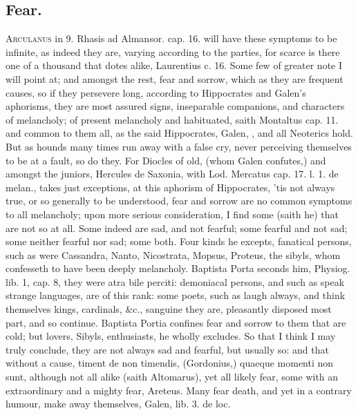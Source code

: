 {\subsection{Fear.}
\lettrine{A}{rculanus} in 9. Rhasis ad Almansor. cap. 16. will have these
symptoms to be infinite, as indeed they are, varying according to the
parties, for scarce is there one of a thousand that dotes alike, 
Laurentius c. 16. Some few of greater note I will point at; and amongst
the rest, fear and sorrow, which as they are frequent causes, so if
they persevere long, according to Hippocrates and Galen's
aphorisms, they are most assured signs, inseparable companions, and
characters of melancholy; of present melancholy and habituated, saith
Montaltus cap. 11. and common to them all, as the said Hippocrates,
Galen, \Avicenna{}, and all Neoterics hold. But as hounds many times run
away with a false cry, never perceiving themselves to be at a fault, so
do they. For Diocles of old, (whom Galen confutes,) and amongst the
juniors, Hercules de Saxonia, with Lod. Mercatus cap. 17. l. 1.
de melan., takes just exceptions, at this aphorism of Hippocrates, 'tis
not always true, or so generally to be understood, fear and sorrow are
no common symptoms to all melancholy; upon more serious consideration,
I find some (saith he) that are not so at all. Some indeed are sad, and
not fearful; some fearful and not sad; some neither fearful nor sad;
some both. Four kinds he excepts, fanatical persons, such as were
Cassandra, Nanto, Nicostrata, Mopsus, Proteus, the sibyls, whom
\Aristotle{} confesseth to have been deeply melancholy. Baptista
Porta seconds him, Physiog. lib. 1, cap. 8, they were atra bile
perciti: demoniacal persons, and such as speak strange languages, are
of this rank: some poets, such as laugh always, and think themselves
kings, cardinals, \&c., sanguine they are, pleasantly disposed most
part, and so continue. Baptista Portia confines fear and sorrow
to them that are cold; but lovers, Sibyls, enthusiasts, he wholly
excludes. So that I think I may truly conclude, they are not always sad
and fearful, but usually so: and that without a cause, timent de
non timendis, (Gordonius,) quaeque momenti non sunt, although not all
alike (saith Altomarus), yet all likely fear, some with an
extraordinary and a mighty fear, Areteus. Many fear death, and
yet in a contrary humour, make away themselves, Galen, lib. 3. de loc.
}

